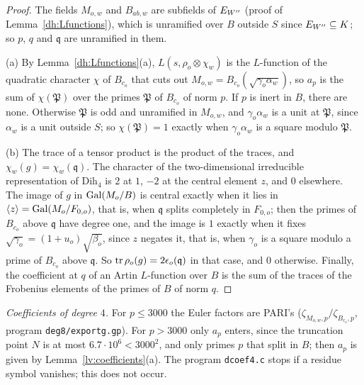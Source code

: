 \begin{proof}
The fields $M_{o,w}$ and $B_{ab,w}$ are subfields of $E_{W''}$ (proof of
Lemma~\ref{dh:Lfunctions}), which is unramified over $B$ outside $S$ since
$E_{W''}\subseteq K$; so $p$, $q$ and $\mathfrak q$ are unramified in them.

(a) By Lemma~\ref{dh:Lfunctions}(a), $L(s,\rho_o\otimes\chi_w)$ is the
$L$-function of the quadratic character $\chi$ of $B_{c_o}$ that cuts out
$M_{o,w}=B_{c_o}(\sqrt{\gamma_o\alpha_w})$, so $a_p$ is the sum of
$\chi(\mathfrak P)$ over the primes $\mathfrak P$ of $B_{c_o}$ of norm $p$.
If $p$ is inert in $B$, there are none. Otherwise $\mathfrak P$ is odd and
unramified in $M_{o,w}$, and $\gamma_o\alpha_w$ is a unit at $\mathfrak P$,
since $\alpha_w$ is a unit outside $S$; so $\chi(\mathfrak P)=1$ exactly when
$\gamma_o\alpha_w$ is a square modulo $\mathfrak P$.

(b) The trace of a tensor product is the product of the traces, and
$\chi_w(g)=\chi_w(\mathfrak q)$. The character of the two-dimensional
irreducible representation of $\mathrm{Dih}_4$ is $2$ at $1$, $-2$ at the
central element $z$, and $0$ elsewhere. The image of $g$ in $\operatorname{Gal}(M_o/B)$ is
central exactly when it lies in $\langle z\rangle=\operatorname{Gal}(M_o/F_{0,o})$, that
is, when $\mathfrak q$ splits completely in $F_{0,o}$; then the primes of
$B_{c_o}$ above $\mathfrak q$ have degree one, and the image is $1$ exactly
when it fixes $\sqrt{\gamma_o}=(1+u_o)\sqrt{\beta_o}$, since $z$ negates
it, that is, when $\gamma_o$ is a square modulo a prime of $B_{c_o}$ above
$\mathfrak q$. So $\operatorname{tr}\rho_o(g)=2\epsilon_o(\mathfrak q)$ in that case, and
$0$ otherwise. Finally, the coefficient at $q$ of an Artin $L$-function over
$B$ is the sum of the traces of the Frobenius elements of the primes of $B$
of norm $q$.
\end{proof}

\emph{Coefficients of degree $4$.} For $p\le3000$ the Euler factors are
PARI's ($\zeta_{M_{o,w},p}/\zeta_{B_{c_o},p}$, program \texttt{deg8/exportg.gp}).
For $p>3000$ only $a_p$ enters, since the truncation point $N$ is at most
$6.7\cdot10^6<3000^2$, and only primes $p$ that split in $B$; then $a_p$ is
given by Lemma~\ref{lv:coefficients}(a). The program \texttt{dcoef4.c} stops
if a residue symbol vanishes; this does not occur.

